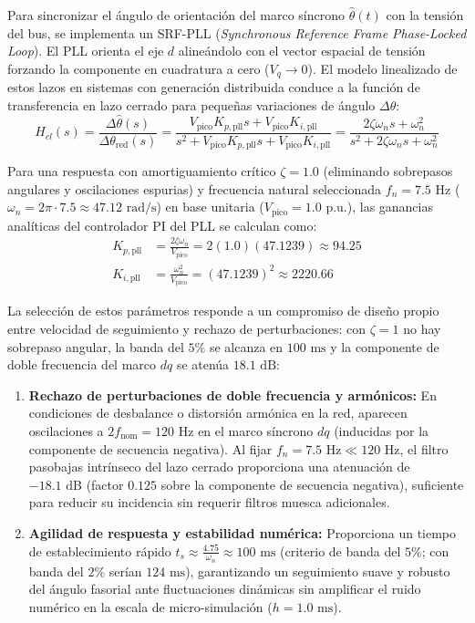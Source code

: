 Para sincronizar el ángulo de orientación del marco síncrono $\hat{\theta}(t)$ con la tensión del bus, se implementa un SRF-PLL (\textit{Synchronous Reference Frame Phase-Locked Loop}). El PLL orienta el eje $d$ alineándolo con el vector espacial de tensión forzando la componente en cuadratura a cero ($V_q \to 0$). El modelo linealizado de estos lazos en sistemas con generación distribuida \citep{Kundu2024ICCFPLL} conduce a la función de transferencia en lazo cerrado para pequeñas variaciones de ángulo $\Delta\theta$:
\begin{equation}
H_{cl}(s) = \frac{\Delta \hat{\theta}(s)}{\Delta \theta_{\text{red}}(s)} = \frac{V_{\text{pico}} K_{p,\text{pll}} s + V_{\text{pico}} K_{i,\text{pll}}}{s^2 + V_{\text{pico}} K_{p,\text{pll}} s + V_{\text{pico}} K_{i,\text{pll}}} = \frac{2\zeta\omega_n s + \omega_n^2}{s^2 + 2\zeta\omega_n s + \omega_n^2}
\end{equation}

Para una respuesta con amortiguamiento crítico $\zeta = 1.0$ (eliminando sobrepasos angulares y oscilaciones espurias) y frecuencia natural seleccionada $f_n = 7.5\text{ Hz}$ ($\omega_n = 2\pi \cdot 7.5 \approx 47.12\text{ rad/s}$) en base unitaria ($V_{\text{pico}} = 1.0\text{ p.u.}$), las ganancias analíticas del controlador PI del PLL se calculan como:
\begin{align}
K_{p,\text{pll}} &= \frac{2\zeta\omega_n}{V_{\text{pico}}} = 2(1.0)(47.1239) \approx 94.25 \label{eq:kp_pll} \\
K_{i,\text{pll}} &= \frac{\omega_n^2}{V_{\text{pico}}} = (47.1239)^2 \approx 2220.66 \label{eq:ki_pll}
\end{align}

La selección de estos parámetros responde a un compromiso de diseño propio entre velocidad de seguimiento y rechazo de perturbaciones: con $\zeta = 1$ no hay sobrepaso angular, la banda del $5\%$ se alcanza en $100\text{ ms}$ y la componente de doble frecuencia del marco $dq$ se atenúa $18.1\text{ dB}$:
\begin{enumerate}[1.]
    \item \textbf{Rechazo de perturbaciones de doble frecuencia y armónicos:} En condiciones de desbalance o distorsión armónica en la red, aparecen oscilaciones a $2f_{\text{nom}} = 120\text{ Hz}$ en el marco síncrono $dq$ (inducidas por la componente de secuencia negativa). Al fijar $f_n = 7.5\text{ Hz} \ll 120\text{ Hz}$, el filtro pasobajas intrínseco del lazo cerrado proporciona una atenuación de $-18.1\text{ dB}$ (factor $0.125$ sobre la componente de secuencia negativa), suficiente para reducir su incidencia sin requerir filtros muesca adicionales.
    \item \textbf{Agilidad de respuesta y estabilidad numérica:} Proporciona un tiempo de establecimiento rápido $t_s \approx \frac{4.75}{\omega_n} \approx 100\text{ ms}$ (criterio de banda del $5\%$; con banda del $2\%$ serían $124\text{ ms}$), garantizando un seguimiento suave y robusto del ángulo fasorial ante fluctuaciones dinámicas sin amplificar el ruido numérico en la escala de micro-simulación ($h = 1.0\text{ ms}$).
\end{enumerate}

